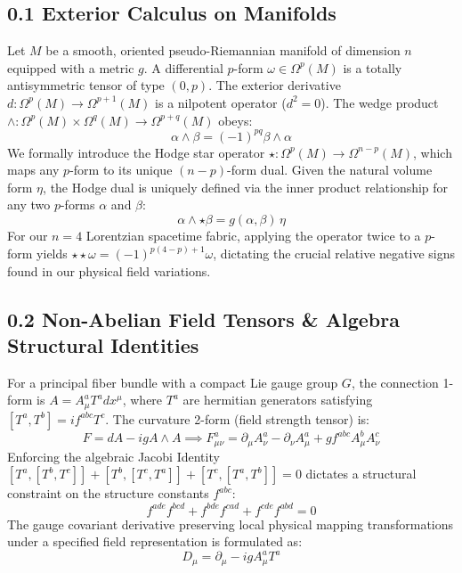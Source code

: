 \documentclass[11pt,a4paper]{article}
\begin{document}
\subsection*{0.1 Exterior Calculus on Manifolds}
Let $M$ be a smooth, oriented pseudo-Riemannian manifold of dimension $n$ equipped with a metric $g$. A differential $p$-form $\omega \in \Omega^p(M)$ is a totally antisymmetric tensor of type $(0,p)$. The exterior derivative $d: \Omega^p(M) \rightarrow \Omega^{p+1}(M)$ is a nilpotent operator ($d^2 = 0$). The wedge product $\wedge: \Omega^p(M) \times \Omega^q(M) \rightarrow \Omega^{p+q}(M)$ obeys:
\begin{equation}
    \alpha \wedge \beta = (-1)^{pq} \beta \wedge \alpha
\end{equation}
We formally introduce the Hodge star operator $\star: \Omega^p(M) \rightarrow \Omega^{n-p}(M)$, which maps any $p$-form to its unique $(n-p)$-form dual. Given the natural volume form $\eta$, the Hodge dual is uniquely defined via the inner product relationship for any two $p$-forms $\alpha$ and $\beta$:
\begin{equation}
    \alpha \wedge \star \beta = g(\alpha, \beta) \, \eta
\end{equation}
For our $n=4$ Lorentzian spacetime fabric, applying the operator twice to a $p$-form yields $\star \star \omega = (-1)^{p(4-p)+1} \omega$, dictating the crucial relative negative signs found in our physical field variations.

\subsection*{0.2 Non-Abelian Field Tensors \& Algebra Structural Identities}
For a principal fiber bundle with a compact Lie gauge group $G$, the connection 1-form is $A = A_{\mu}^a T^a dx^{\mu}$, where $T^a$ are hermitian generators satisfying $[T^a, T^b] = i f^{abc} T^c$. The curvature 2-form (field strength tensor) is:
\begin{equation}
    F = dA - i g A \wedge A \implies F_{\mu\nu}^a = \partial_{\mu} A_{\nu}^a - \partial_{\nu} A_{\mu}^a + g f^{abc} A_{\mu}^b A_{\nu}^c
\end{equation}
Enforcing the algebraic Jacobi Identity $[T^a,[T^b,T^c]] + [T^b,[T^c,T^a]] + [T^c,[T^a,T^b]] = 0$ dictates a structural constraint on the structure constants $f^{abc}$:
\begin{equation}
    f^{ade}f^{bcd} + f^{bde}f^{cad} + f^{cde}f^{abd} = 0
\end{equation}
The gauge covariant derivative preserving local physical mapping transformations under a specified field representation is formulated as:
\begin{equation}
    D_{\mu} = \partial_{\mu} - i g A_{\mu}^a T^a
\end{equation}
\end{document}
